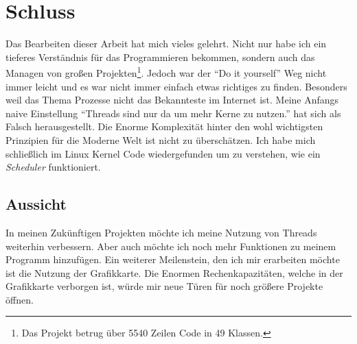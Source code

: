 \section{Schluss}
Das Bearbeiten dieser Arbeit hat mich vieles gelehrt. Nicht nur habe ich ein tieferes Verständnis für das Programmieren bekommen, sondern auch das Managen von großen Projekten\footnote{Das Projekt betrug über 5540 Zeilen Code in 49 Klassen.}. Jedoch war der ``Do it yourself'' Weg nicht immer leicht und es war nicht immer einfach etwas richtiges zu finden. Besonders weil das Thema Prozesse nicht das Bekannteste im Internet ist. Meine Anfangs naive Einstellung ``Threads sind nur da um mehr Kerne zu nutzen.'' hat sich als Falsch herausgestellt. Die Enorme Komplexität hinter den wohl wichtigsten Prinzipien für die Moderne Welt ist nicht zu überschätzen. Ich habe mich schließlich im Linux Kernel Code wiedergefunden um zu verstehen, wie ein \textit{Scheduler} funktioniert.

\subsection{Aussicht}
In meinen Zukünftigen Projekten möchte ich meine Nutzung von Threads weiterhin verbessern. Aber auch möchte ich noch mehr Funktionen zu meinem Programm hinzufügen. Ein weiterer Meilenstein, den ich mir erarbeiten möchte ist die Nutzung der Grafikkarte. Die Enormen Rechenkapazitäten, welche in der Grafikkarte verborgen ist, würde mir neue Türen für noch größere Projekte öffnen.
